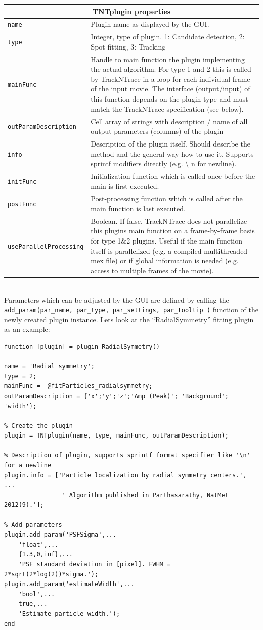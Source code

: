\documentclass[11pt,onside]{report}
\numberwithin{equation}{chapter}
\begin{document}
\begin{tabular}{p{} p{}}
 \toprule \multicolumn{2}{c}{TNTplugin properties} \\  \midrule
  \texttt{name} & Plugin name as displayed by the GUI. \\
  \texttt{type} & Integer, type of plugin. 1: Candidate detection, 2: Spot fitting, 3: Tracking \\
  \texttt{mainFunc} & Handle to main function the plugin implementing the actual algorithm. For type 1 and 2 this is called by TrackNTrace in a loop for each individual frame of the input movie. The interface (output/input) of this function depends on the plugin type and must match the TrackNTrace specification (see below). \\
  \texttt{outParamDescription} &  Cell array of strings with description / name of all output parameters (columns) of the plugin \\
 \texttt{info} & Description of the plugin itself. Should describe the method and the general way how to use it. Supports sprintf modifiers directly (e.g. \textbackslash{} n for newline). \\
  \texttt{initFunc} &  Initialization function which is called once before the main is first executed. \\
  \texttt{postFunc} & Post-processing function which is called after the main function is last executed. \\
  \texttt{useParallelProcessing}&  Boolean. If false, TrackNTrace does not parallelize this plugins main function on a frame-by-frame basis for type 1\&2 plugins. Useful if the main function itself is parallelized (e.g. a compiled multithreaded mex file) or if global information is needed (e.g. access to multiple frames of the movie).\\
  \bottomrule
\end{tabular}\\

Parameters which can be adjusted by the GUI are defined by calling the \texttt{add\_param(par\_name, par\_type, par\_settings, par\_tooltip )} function of the newly created plugin instance. Lets look at the ``RadialSymmetry'' fitting plugin as an example:
\begin{verbatim}
function [plugin] = plugin_RadialSymmetry()

name = 'Radial symmetry';
type = 2;
mainFunc =  @fitParticles_radialsymmetry;
outParamDescription = {'x';'y';'z';'Amp (Peak)'; 'Background'; 'width'};

% Create the plugin
plugin = TNTplugin(name, type, mainFunc, outParamDescription);

% Description of plugin, supports sprintf format specifier like '\n' for a newline
plugin.info = ['Particle localization by radial symmetry centers.', ...
                ' Algorithm published in Parthasarathy, NatMet 2012(9).'];

% Add parameters
plugin.add_param('PSFSigma',...
    'float',...
    {1.3,0,inf},...
    'PSF standard deviation in [pixel]. FWHM = 2*sqrt(2*log(2))*sigma.');
plugin.add_param('estimateWidth',...
    'bool',...
    true,...
    'Estimate particle width.');
end
\end{verbatim}
 
\end{document}
